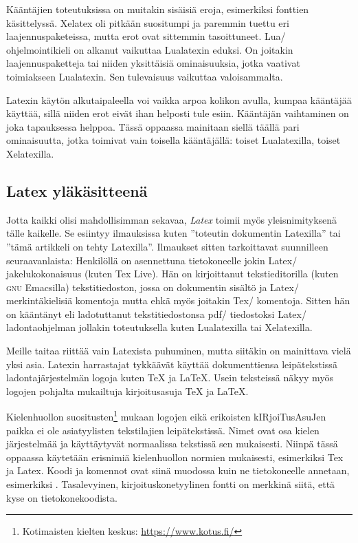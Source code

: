 Kääntäjien toteutuksissa on muitakin sisäisiä eroja, esimerkiksi
fonttien käsittelyssä. Xelatex oli pitkään suositumpi ja paremmin tuettu
eri laajennuspaketeissa, mutta erot ovat sittemmin tasoittuneet. Lua\-/
ohjelmointikieli on alkanut vaikuttaa Lualatexin eduksi. On joitakin
laajennuspaketteja tai niiden yksittäisiä ominaisuuksia, jotka vaativat
toimiakseen Lualatexin. Sen tulevaisuus vaikuttaa valoisammalta.

Latexin käytön alkutaipaleella voi vaikka arpoa kolikon avulla, kumpaa
kääntäjää käyttää, sillä niiden erot eivät ihan helposti tule esiin.
Kääntäjän vaihtaminen on joka tapauksessa helppoa. Tässä oppaassa
mainitaan siellä täällä pari ominaisuutta, jotka toimivat vain toisella
kääntäjällä: toiset Lualatexilla, toiset Xelatexilla.

\subsection{Latex yläkäsitteenä}

Jotta kaikki olisi mahdollisimman sekavaa, \emph{Latex} toimii myös
yleisnimityksenä tälle kaikelle. Se esiintyy ilmauksissa kuten
''toteutin dokumentin Latexilla'' tai ''tämä artikkeli on tehty
Latexilla''. Ilmaukset sitten tarkoittavat suunnilleen seuraavanlaista:
Henkilöllä on asennettuna tietokoneelle jokin Latex\-/ jakelukokonaisuus
(kuten Tex Live). Hän on kirjoittanut tekstieditorilla (kuten
\textsc{gnu} Emacsilla) tekstitiedoston, jossa on dokumentin sisältö ja
Latex\-/ merkintäkielisiä komentoja mutta ehkä myös joitakin Tex\-/
komentoja. Sitten hän on kääntänyt eli ladotuttanut tekstitiedostonsa
pdf\-/ tiedostoksi Latex\-/ ladontaohjelman jollakin toteutuksella kuten
Lualatexilla tai Xelatexilla.

Meille taitaa riittää vain Latexista puhuminen, mutta siitäkin on
mainittava vielä yksi asia. Latexin harrastajat tykkäävät käyttää
dokumenttiensa leipätekstissä ladontajärjestelmän logoja kuten \TeX{} ja
\LaTeX{}. Usein teksteissä näkyy myös logojen pohjalta mukailtuja
kirjoitusasuja TeX ja LaTeX.

Kielenhuollon suositusten\footnote{Kotimaisten kielten keskus:
  \url{https://www.kotus.fi/}} mukaan logojen eikä erikoisten
kIRjoiTusAsuJen paikka ei ole asiatyylisten tekstilajien leipätekstissä.
Nimet ovat osa kielen järjestelmää ja käyttäytyvät normaalissa tekstissä
sen mukaisesti. Niinpä tässä oppaassa käytetään erisnimiä kielenhuollon
normien mukaisesti, esimerkiksi Tex ja Latex. Koodi ja komennot ovat
siinä muodossa kuin ne tietokoneelle annetaan, esimerkiksi
. Tasalevyinen, kirjoituskonetyylinen fontti on merkkinä
siitä, että kyse on tietokonekoodista.

